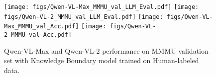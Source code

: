 \begin{figure*}[tb]
    \centering
    \texttt{[image: figs/Qwen-VL-Max\_MMMU\_val\_LLM\_Eval.pdf]}
    \texttt{[image: figs/Qwen-VL-2\_MMMU\_val\_LLM\_Eval.pdf]}
    \texttt{[image: figs/Qwen-VL-Max\_MMMU\_val\_Acc.pdf]}
    \texttt{[image: figs/Qwen-VL-2\_MMMU\_val\_Acc.pdf]}
    \caption{Qwen-VL-Max and Qwen-VL-2 performance on MMMU validation set with Knowledge Boundary model trained on Human-labeled data.}
    \label{mmmu_radar_fig}
\end{figure*}
